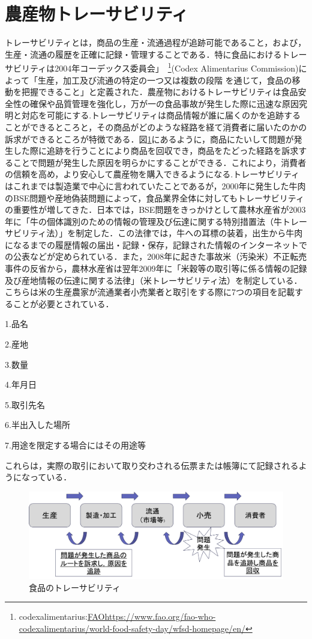 \documentclass[11pt,dvipdfmx]{jreport}
\begin{document}
\section{農産物トレーサビリティ}
トレーサビリティとは，商品の生産・流通過程が追跡可能であること，および，生産・流通の履歴を正確に記録・管理することである．特に食品におけるトレーサビリティは2004年コーデックス委員会」~\footnote{codexalimentarius:\url{FAOhttps://www.fao.org/fao-who-codexalimentarius/world-food-safety-day/wfsd-homepage/en/}}(Codex Alimentarius Commission)によって「生産，加工及び流通の特定の一つ又は複数の段階 を通じて，食品の移動を把握できること」と定義された．農産物におけるトレーサビリティは食品安全性の確保や品質管理を強化し，万が一の食品事故が発生した際に迅速な原因究明と対応を可能にする.トレーサビリティは商品情報が誰に届くのかを追跡することができるところと，その商品がどのような経路を経て消費者に届いたのかの訴求ができるところが特徴である．図\ref{fig:toresa}にあるように，商品にたいして問題が発生した際に追跡を行うことにより商品を回収でき，商品をたどった経路を訴求することで問題が発生した原因を明らかにすることができる．これにより，消費者の信頼を高め，より安心して農産物を購入できるようになる.トレーサビリティはこれまでは製造業で中心に言われていたことであるが，2000年に発生した牛肉のBSE問題や産地偽装問題によって，食品業界全体に対してもトレーサビリティの重要性が増してきた．日本では，BSE問題をきっかけとして農林水産省が2003年に「牛の個体識別のための情報の管理及び伝達に関する特別措置法（牛トレーサビリティ法）」を制定した．この法律では，牛への耳標の装着，出生から牛肉になるまでの履歴情報の届出・記録・保存，記録された情報のインターネットでの公表などが定められている．また，2008年に起きた事故米（汚染米）不正転売事件の反省から，農林水産省は翌年2009年に「米穀等の取引等に係る情報の記録及び産地情報の伝達に関する法律」（米トレーサビリティ法）を制定している．こちらは米の生産農家が流通業者小売業者と取引をする際に7つの項目を記載することが必要とされている．

1.品名

2.産地

3.数量

4.年月日

5.取引先名

6.半出入した場所

7.用途を限定する場合にはその用途等

これらは，実際の取引において取り交わされる伝票または帳簿にて記録されるようになっている．

\begin{figure}[t]
	\includegraphics[width=1.0\linewidth]{Haraguchi_fig/toresa.pdf}
	\caption{食品のトレーサビリティ}
	\label{fig:toresa}
\end{figure}
\end{document}
